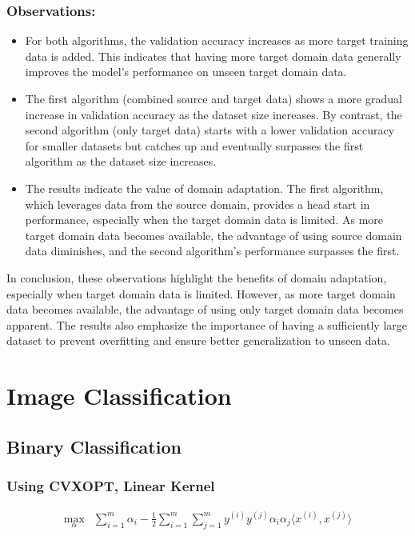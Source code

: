 \documentclass[12pt,a4paper]{article}
\begin{document}
\subsubsection{Observations:}
\begin{itemize}
    \item For both algorithms, the validation accuracy increases as more target training data is added. This indicates that having more target domain data generally improves the model's performance on unseen target domain data.
    \item The first algorithm (combined source and target data) shows a more gradual increase in validation accuracy as the dataset size increases. By contrast, the second algorithm (only target data) starts with a lower validation accuracy for smaller datasets but catches up and eventually surpasses the first algorithm as the dataset size increases.
    \item The results indicate the value of domain adaptation. The first algorithm, which leverages data from the source domain, provides a head start in performance, especially when the target domain data is limited. As more target domain data becomes available, the advantage of using source domain data diminishes, and the second algorithm's performance surpasses the first.
\end{itemize}
In conclusion, these observations highlight the benefits of domain adaptation, especially when target domain data is limited. However, as more target domain data becomes available, the advantage of using only target domain data becomes apparent. The results also emphasize the importance of having a sufficiently large dataset to prevent overfitting and ensure better generalization to unseen data.

\section{Image Classification}
\subsection{Binary Classification}
\subsubsection{Using CVXOPT, Linear Kernel}

\begin{align*}
\max_{\alpha} & \sum_{i=1}^{m} \alpha_i - \frac{1}{2} \sum_{i=1}^{m} \sum_{j=1}^{m} y^{(i)} y^{(j)} \alpha_i \alpha_j \langle x^{(i)}, x^{(j)} \rangle
\end{align*}
\end{document}
